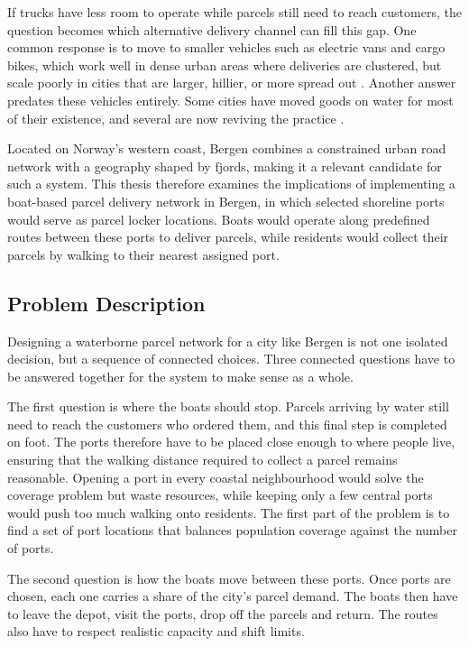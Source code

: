 \documentclass[12pt]{article}
\begin{document}
If trucks have less room to operate while parcels still need to reach customers, the question becomes which alternative delivery channel can fill this gap. One common response is to move to smaller vehicles such as electric vans and cargo bikes, which work well in dense urban areas where deliveries are clustered, but scale poorly in cities that are larger, hillier, or more spread out \parencite{NARAYANAN2022278}. Another answer predates these vehicles entirely. Some cities have moved goods on water for most of their existence, and several are now reviving the practice \parencite{dhlboats,fludis}.

Located on Norway's western coast, Bergen combines a constrained urban road network with a geography shaped by fjords, making it a relevant candidate for such a system. This thesis therefore examines the implications of implementing a boat-based parcel delivery network in Bergen, in which selected shoreline ports would serve as parcel locker locations. Boats would operate along predefined routes between these ports to deliver parcels, while residents would collect their parcels by walking to their nearest assigned port.

\subsection{Problem Description}
\label{subsec:problem-description}

Designing a waterborne parcel network for a city like Bergen is not one isolated decision, but a sequence of connected choices. Three connected questions have to be answered together for the system to make sense as a whole.

The first question is where the boats should stop. Parcels arriving by water still need to reach the customers who ordered them, and this final step is completed on foot. The ports therefore have to be placed close enough to where people live, ensuring that the walking distance required to collect a parcel remains reasonable. Opening a port in every coastal neighbourhood would solve the coverage problem but waste resources, while keeping only a few central ports would push too much walking onto residents. The first part of the problem is to find a set of port locations that balances population coverage against the number of ports.

The second question is how the boats move between these ports. Once ports are chosen, each one carries a share of the city's parcel demand. The boats then have to leave the depot, visit the ports, drop off the parcels and return. The routes also have to respect realistic capacity and shift limits.
\end{document}
